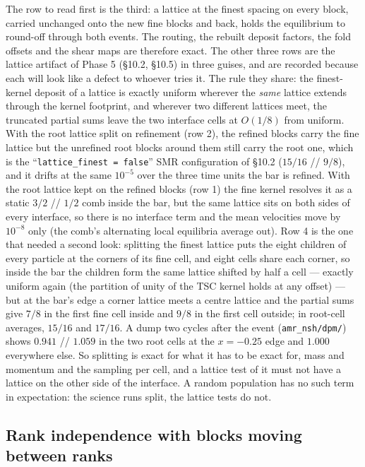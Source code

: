 \documentclass[11pt]{article}
\newcommand{\code}[1]{\texttt{#1}}
\newcommand{\file}[1]{\texttt{#1}}
\begin{document}
The row to read first is the third: a lattice at the finest spacing on every block,
carried unchanged onto the new fine blocks and back, holds the equilibrium to round-off
through both events. The routing, the rebuilt deposit factors, the fold offsets and the
shear maps are therefore exact. The other three rows are the lattice artifact of Phase 5
(\S10.2, \S10.5) in three guises, and are recorded because each will look like a defect
to whoever tries it. The rule they share: the finest-kernel deposit of a lattice is
exactly uniform wherever the \emph{same} lattice extends through the kernel footprint,
and wherever two different lattices meet, the truncated partial sums leave the two
interface cells at $O(1/8)$ from uniform. With the root lattice split on refinement
(row 2), the refined blocks carry the fine lattice but the unrefined root blocks around
them still carry the root one, which is the ``\code{lattice\_finest = false}'' SMR
configuration of \S10.2 ($15/16$ // $9/8$), and it drifts at the same $10^{-5}$ over
the three time units the bar is refined. With the root lattice kept on the refined
blocks (row 1) the fine kernel resolves it as a static $3/2$ // $1/2$ comb inside the
bar, but the same lattice sits on both sides of every interface, so there is no
interface term and the mean velocities move by $10^{-8}$ only (the comb's alternating
local equilibria average out). Row 4 is the one that needed a second look: splitting the
finest lattice puts the eight children of every particle at the corners of its fine
cell, and eight cells share each corner, so inside the bar the children form the same
lattice shifted by half a cell --- exactly uniform again (the partition of unity of the
TSC kernel holds at any offset) --- but at the bar's edge a corner lattice meets a centre
lattice and the partial sums give $7/8$ in the first fine cell inside and $9/8$ in the
first cell outside; in root-cell averages, $15/16$ and $17/16$. A dump two cycles after
the event (\file{amr\_nsh/dpm/}) shows $0.941$ // $1.059$ in the two root cells at the
$x = -0.25$ edge and $1.000$ everywhere else. So splitting is exact for what it has to be
exact for, mass and momentum and the sampling per cell, and a lattice test of it must
not have a lattice on the other side of the interface. A random population has no such
term in expectation: the science runs split, the lattice tests do not.

\subsection{Rank independence with blocks moving between ranks}
\end{document}
